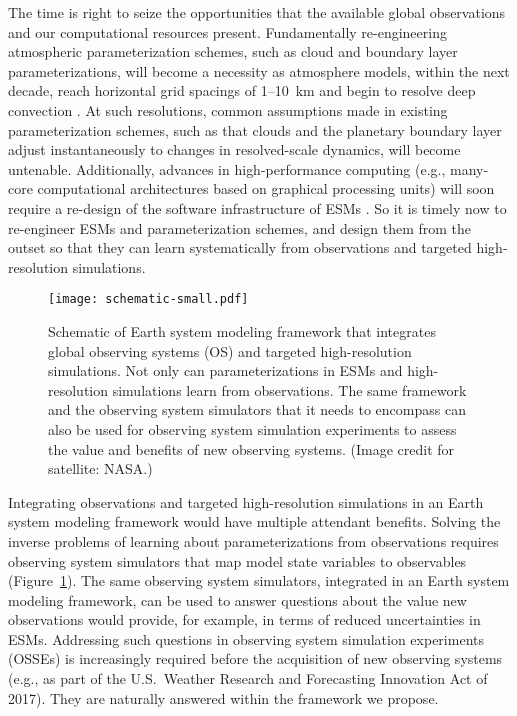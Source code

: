 \documentclass[draft]{agujournal}
\begin{document}
The time is right to seize the opportunities that the available global observations and our computational resources present. Fundamentally re-engineering atmospheric parameterization schemes, such as cloud and boundary layer parameterizations, will become a necessity as atmosphere models, within the next decade, reach horizontal grid spacings of 1--10~km and begin to resolve deep convection \citep{Schneider17a}. At such resolutions, common assumptions made in existing parameterization schemes, such as that clouds and the planetary boundary layer adjust instantaneously to changes in resolved-scale dynamics, will become untenable. Additionally, advances in high-performance computing (e.g., many-core computational architectures based on graphical processing units) will soon require a re-design of the software infrastructure of ESMs \citep{Bretherton12a,Schulthess15a,Schalkwijk15a}. So it is timely now to re-engineer ESMs and parameterization schemes, and design them from the outset so that they can learn systematically from observations and targeted high-resolution simulations. 

\begin{figure}[h]
\centering
\texttt{[image: schematic-small.pdf]}
\caption{Schematic of Earth system modeling framework that integrates global observing systems (OS) and targeted high-resolution simulations. Not only can parameterizations in ESMs and high-resolution simulations learn from observations. The same framework and the observing system simulators that it needs to encompass can also be used for observing system simulation experiments to assess the value and benefits of new observing systems. (Image credit for satellite: NASA.)}
\label{f:schematic}
\end{figure}
Integrating observations and targeted high-resolution simulations in an Earth system modeling framework would have multiple attendant benefits. Solving the inverse problems of learning about parameterizations from observations requires observing system simulators that map model state variables to observables (Figure~\ref{f:schematic}). The same observing system simulators, integrated in an Earth system modeling framework, can be used to answer questions about the value new observations would provide, for example, in terms of reduced uncertainties in ESMs. Addressing such questions in observing system simulation experiments (OSSEs) is increasingly required before the acquisition of new observing systems (e.g., as part of the U.S.\ Weather Research and Forecasting Innovation Act of 2017). They are naturally answered within the framework we propose.
\end{document}
